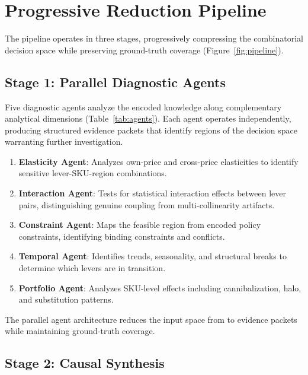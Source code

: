 \section{Progressive Reduction Pipeline}
\label{sec:pipeline}

The pipeline operates in three stages, progressively compressing the combinatorial decision space while preserving ground-truth coverage (Figure~\ref{fig:pipeline}).

\subsection{Stage 1: Parallel Diagnostic Agents}

Five diagnostic agents analyze the encoded knowledge along complementary analytical dimensions (Table~\ref{tab:agents}).
Each agent operates independently, producing structured evidence packets that identify regions of the decision space warranting further investigation.

\begin{enumerate}
    \item \textbf{Elasticity Agent}: Analyzes own-price and cross-price elasticities to identify sensitive lever-SKU-region combinations.
    \item \textbf{Interaction Agent}: Tests for statistical interaction effects between lever pairs, distinguishing genuine coupling from multi-collinearity artifacts.
    \item \textbf{Constraint Agent}: Maps the feasible region from encoded policy constraints, identifying binding constraints and conflicts.
    \item \textbf{Temporal Agent}: Identifies trends, seasonality, and structural breaks to determine which levers are in transition.
    \item \textbf{Portfolio Agent}: Analyzes SKU-level effects including cannibalization, halo, and substitution patterns.
\end{enumerate}

The parallel agent architecture reduces the input space from \PIPELINEINPUT{} to  evidence packets while maintaining  ground-truth coverage.



\subsection{Stage 2: Causal Synthesis}

